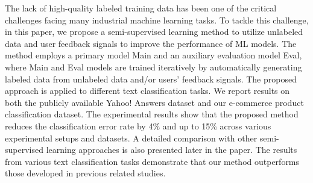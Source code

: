 The lack of high-quality labeled training data has been one of the critical challenges facing many industrial machine learning tasks. To tackle this challenge, in this paper, we propose a semi-supervised learning method to utilize unlabeled data and user feedback signals to improve the performance of ML models. The method employs a primary model Main and an auxiliary evaluation model Eval, where Main and Eval models are trained iteratively by automatically generating labeled data from unlabeled data and/or users' feedback signals. The proposed approach is applied to different text classification tasks. We report results on both the publicly available Yahoo! Answers dataset and our e-commerce product classification dataset. The experimental results show that the proposed method reduces the classification error rate by 4\% and up to 15\% across various experimental setups and datasets. A detailed comparison with other semi-supervised learning approaches is also presented later in the paper. The results from various text classification tasks demonstrate that our method outperforms those developed in previous related studies.
